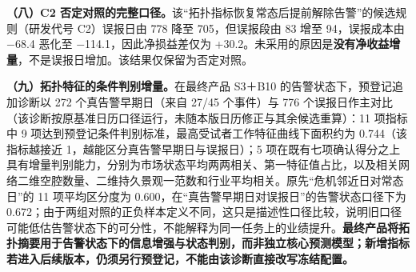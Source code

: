 \documentclass[12pt,a4paper]{ctexart}
\begin{document}
\textbf{（八）C2 否定对照的完整口径。}该“拓扑指标恢复常态后提前解除告警”的候选规则（研发代号 C2）误报日由 778 降至 705，但误报段由 83 增至 94，误报成本由 \(-\)68.4 恶化至 \(-\)114.1，因此净损益差仅为 +30.2。未采用的原因是\textbf{没有净收益增量}，不是误报日增加。该结果仅保留为否定对照。\par
\textbf{（九）拓扑特征的条件判别增量。}在最终产品 S3＋B10 的告警状态下，预登记追加诊断以 272 个真告警早期日（来自 27/45 个事件）与 776 个误报日作主对比（该诊断按原基准日历口径运行，未随本版日历修正与其余候选重算）：11 项指标中 9 项达到预登记条件判别标准，最高受试者工作特征曲线下面积约为 0.744（该指标越接近 1，越能区分真告警早期日与误报日）；5 项在既有七项确认得分之上具有增量判别能力，分别为市场状态平均两两相关、第一特征值占比，以及相关网络二维空腔数量、二维持久景观一范数和行业平均相关。原先“危机邻近日对常态日”的 11 项平均区分度为 0.600，在“真告警早期日对误报日”的告警状态口径下为 0.672；由于两组对照的正负样本定义不同，这只是描述性口径比较，说明旧口径可能低估告警状态下的可分性，不能解释为同一任务上的业绩提升。\textbf{最终产品将拓扑摘要用于告警状态下的信息增强与状态判别，而非独立核心预测模型；新增指标若进入后续版本，仍须另行预登记，不能由该诊断直接改写冻结配置。}\par
\end{document}

